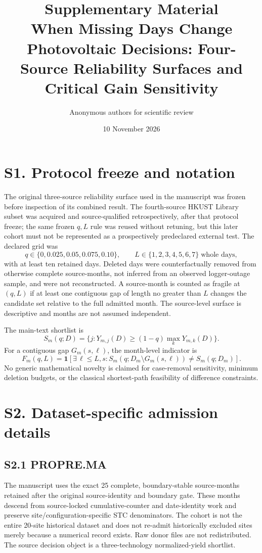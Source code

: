\documentclass[11pt]{article}
\title{\textbf{Supplementary Material}\\[0.4em]
\large When Missing Days Change Photovoltaic Decisions: Four-Source Reliability Surfaces and Critical Gain Sensitivity}
\author{Anonymous authors for scientific review}
\date{10 November 2026}
\begin{document}
\maketitle

\section*{S1. Protocol freeze and notation}
The original three-source reliability surface used in the manuscript was frozen before inspection of its combined result. The fourth-source HKUST Library subset was acquired and source-qualified retrospectively, after that protocol freeze; the same frozen $q,L$ rule was reused without retuning, but this later cohort must not be represented as a prospectively predeclared external test. The declared grid was
\[
q\in\{0,0.025,0.05,0.075,0.10\},\qquad L\in\{1,2,3,4,5,6,7\}\;\text{whole days},
\]
with at least ten retained days. Deleted days were counterfactually removed from otherwise complete source-months, not inferred from an observed logger-outage sample, and were not reconstructed. A source-month is counted as fragile at $(q,L)$ if at least one contiguous gap of length no greater than $L$ changes the candidate set relative to the full admitted month. The source-level surface is descriptive and months are not assumed independent.

The main-text shortlist is
\[
S_m(q;D)=\{j:Y_{m,j}(D)\ge (1-q)\max_kY_{m,k}(D)\}.
\]
For a contiguous gap $G_m(s,\ell)$, the month-level indicator is
\[
F_m(q,L)=\mathbf{1}[\exists\,\ell\le L,s: S_m(q;D_m\setminus G_m(s,\ell))\ne S_m(q;D_m)].
\]
No generic mathematical novelty is claimed for case-removal sensitivity, minimum deletion budgets, or the classical shortest-path feasibility of difference constraints.

\section*{S2. Dataset-specific admission details}
\subsection*{S2.1 PROPRE.MA}
The manuscript uses the exact 25 complete, boundary-stable source-months retained after the original source-identity and boundary gate. These months descend from source-locked cumulative-counter and date-identity work and preserve site/configuration-specific STC denominators. The cohort is not the entire 20-site historical dataset and does not re-admit historically excluded sites merely because a numerical record exists. Raw donor files are not redistributed. The source decision object is a three-technology normalized-yield shortlist.
\end{document}
